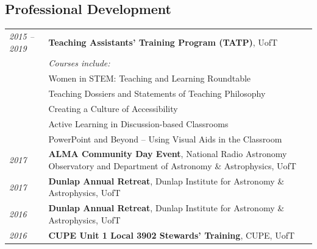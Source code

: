 \documentclass[10pt]{res} %
\begin{document}
\begin{resume}

\section{\Large Professional Development}
\vspace{-5pt} %
\noindent\makebox[\linewidth]{\rule{\textwidth}{0.4pt}}
\vspace{-20pt} %

\begin{table}[h!]
\begin{tabularx}{\textwidth}{lX}
\textit{2015 -- 2019}  & \textbf{Teaching Assistants' Training Program (TATP)}, UofT \\
				& \textit{Courses include:} \\
                                  & Women in STEM: Teaching and Learning Roundtable \\
                                  & Teaching Dossiers and Statements of Teaching Philosophy \\
                                  & Creating a Culture of Accessibility \\
                                  & Active Learning in Discussion-based Classrooms \\
                                  & PowerPoint and Beyond -- Using Visual Aids in the Classroom \\
\textit{2017} & \textbf{ALMA Community Day Event}, National Radio Astronomy Observatory and Department of Astronomy \& Astrophysics, UofT \\
\textit{2017} & \textbf{Dunlap Annual Retreat}, Dunlap Institute for Astronomy \& Astrophysics, UofT \\
\textit{2016} & \textbf{Dunlap Annual Retreat}, Dunlap Institute for Astronomy \& Astrophysics, UofT \\
\textit{2016} & \textbf{CUPE Unit 1 Local 3902 Stewards' Training}, CUPE, UofT
\end{tabularx}
\end{table}


\end{resume}
\end{document}
